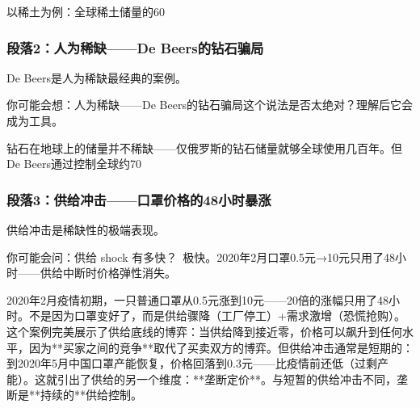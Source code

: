 \documentclass[a4paper,12pt]{book}
\begin{document}
以稀土为例：全球稀土储量的60%

	\subsubsection*{段落2：人为稀缺——De Beers的钻石骗局}
	De Beers是人为稀缺最经典的案例。
	\begin{tcolorbox}[colback=yellow!5, title=\textit{读者行为预测}]
		你可能会想：人为稀缺——De Beers的钻石骗局这个说法是否太绝对？理解后它会成为工具。
	\end{tcolorbox}

钻石在地球上的储量并不稀缺——仅俄罗斯的钻石储量就够全球使用几百年。但De Beers通过控制全球约70%

	\subsubsection*{段落3：供给冲击——口罩价格的48小时暴涨}
	供给冲击是稀缺性的极端表现。
	\begin{tcolorbox}[colback=yellow!5, title=\textit{读者行为预测}]
		你可能会问：供给 shock 有多快？\ 极快。2020年2月口罩0.5元→10元只用了48小时——供给中断时价格弹性消失。
	\end{tcolorbox}

2020年2月疫情初期，一只普通口罩从0.5元涨到10元——20倍的涨幅只用了48小时。不是因为口罩变好了，而是供给骤降（工厂停工）+需求激增（恐慌抢购）。这个案例完美展示了供给底线的博弈：当供给降到接近零，价格可以飙升到任何水平，因为**买家之间的竞争**取代了买卖双方的博弈。但供给冲击通常是短期的：到2020年5月中国口罩产能恢复，价格回落到0.3元——比疫情前还低（过剩产能）。这就引出了供给的另一个维度：**垄断定价**。与短暂的供给冲击不同，垄断是**持续的**供给控制。
\end{document}
